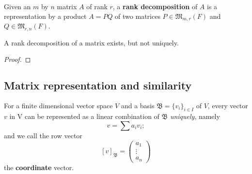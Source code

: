 \begin{defn}
Given an $m$ by $n$ matrix $A$ of rank $r$, a \textbf{rank decomposition} of $A$ is a representation by a product $A=PQ$ of two matrices $P\in\mathfrak M_{m,r}(F)$ and $Q\in\mathfrak M_{r,n}(F).$
\end{defn}
\begin{theorem}
A rank decomposition of a matrix exists, but not uniquely.
\end{theorem}
\begin{proof}
\end{proof}


\subsection{Matrix representation and similarity}
\begin{defn}
For a finite dimensional vector space $V$ and a basis $\mathfrak B = \{v_i\}_{i\in I}$ of $V$, every vector $v$ in V can be represented as a linear combination of $\mathfrak B$ \textit{uniquely}, namely $$v = \sum a_i v_i;$$ and we call the row vector $$[v]_{\mathfrak B} = \begin{pmatrix}a_1 \\ \vdots \\ a_n\end{pmatrix}$$ the \textbf{coordinate} vector.
\end{defn}

